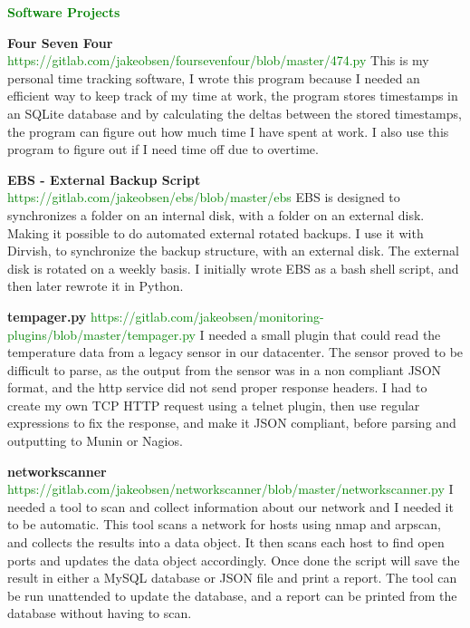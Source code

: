 \documentclass[11pt]{article}
\begin{document}
\newpage

\textcolor{green}{{\fontsize{13}{16}\textbf{{Software Projects}}}}\newline

\textbf{Four Seven Four}\newline
\textcolor{green}{https://gitlab.com/jakeobsen/foursevenfour/blob/master/474.py}\newline
This is my personal time tracking software, I wrote this program because I needed an efficient way to keep track
of my time at work, the program stores timestamps in an SQLite database and by calculating the deltas between
the stored timestamps, the program can figure out how much time I have spent at work. I also use this program to
figure out if I need time off due to overtime.\newline

\textbf{EBS - External Backup Script}\newline
\textcolor{green}{https://gitlab.com/jakeobsen/ebs/blob/master/ebs}\newline
EBS is designed to synchronizes a folder on an internal disk, with a folder on an external disk. Making it
possible to do automated external rotated backups. I use it with Dirvish, to synchronize the backup structure,
with an external disk. The external disk is rotated on a weekly basis. I initially wrote EBS as a bash shell
script, and then later rewrote it in Python.\newline

\textbf{tempager.py}\newline
\textcolor{green}{https://gitlab.com/jakeobsen/monitoring-plugins/blob/master/tempager.py}\newline
I needed a small plugin that could read the temperature data from a legacy sensor in our datacenter. The sensor
proved to be difficult to parse, as the output from the sensor was in a non compliant JSON format, and the http
service did not send proper response headers. I had to create my own TCP HTTP request using a telnet plugin,
then use regular expressions to fix the response, and make it JSON compliant, before parsing and outputting to
Munin or Nagios.\newline

\textbf{networkscanner}\newline
\textcolor{green}{https://gitlab.com/jakeobsen/networkscanner/blob/master/networkscanner.py}\newline
I needed a tool to scan and collect information about our network and I needed it to be automatic. This tool
scans a network for hosts using nmap and arpscan, and collects the results into a data object. It then scans
each host to find open ports and updates the data object accordingly. Once done the script will save the result
in either a MySQL database or JSON file and print a report. The tool can be run unattended to update the
database, and a report can be printed from the database without having to scan.\newline
\end{document}
